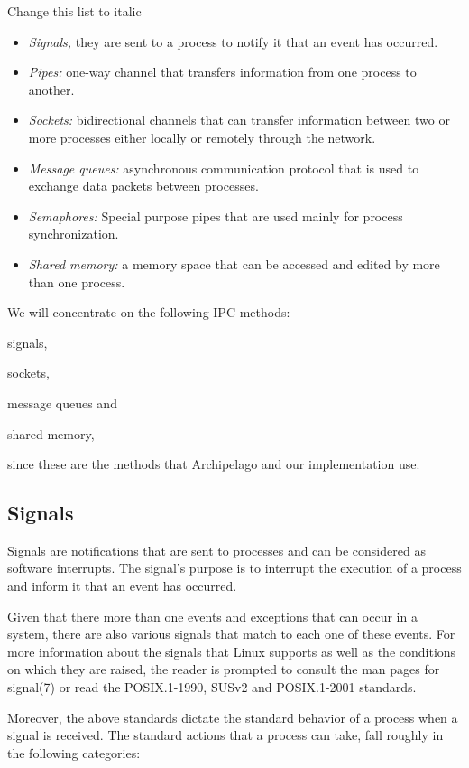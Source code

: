 \fixme Change this list to italic
\begin{itemize}
	\item \textit{Signals,} they are sent to a process to notify it that an 
		event has occurred.
	\item \textit{Pipes:} one-way channel that transfers information from 
		one process to another.
	\item \textit{Sockets:} bidirectional channels that can transfer 
		information between two or more processes either locally or 
		remotely through the network.
	\item \textit{Message queues:} asynchronous communication protocol that 
		is used to exchange data packets between processes.
	\item \textit{Semaphores:} Special purpose pipes that are used mainly 
		for process synchronization.
	\item \textit{Shared memory:} a memory space that can be accessed and 
		edited by more than one process.
\end{itemize}

We will concentrate on the following IPC methods:
\begin{inparaenum}[i)]
\item signals,
\item sockets,
\item message queues and
\item shared memory,
\end{inparaenum}
since these are the methods that Archipelago and our implementation use.

\subsection{Signals}

Signals are notifications that are sent to processes and can be considered as 
software interrupts. The signal's purpose is to interrupt the execution of a
process and inform it that an event has occurred.

Given that there more than one events and exceptions that can occur in a 
system, there are also various signals that match to each one of these
events. For more information about the signals that Linux supports as well as 
the conditions on which they are raised, the reader is prompted to consult the 
man pages for signal(7) or read the POSIX.1-1990, SUSv2 and POSIX.1-2001 
standards.
  
Moreover, the above standards dictate the standard behavior of a process when a 
signal is received. The standard actions that a process can take, fall roughly 
in the following categories:

